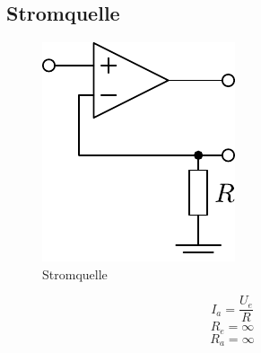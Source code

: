 



\subsection{Stromquelle}
\begin{figure}[h!]
	\centering
	\includegraphics[scale=\schscale]{op_isource.pdf}
	\caption{Stromquelle}
	\label{sch:op-isource}
\end{figure}
\[ I_a = \frac{U_e}{R} \]
\[ R_e = \infty \]
\[ R_a = \infty \]
